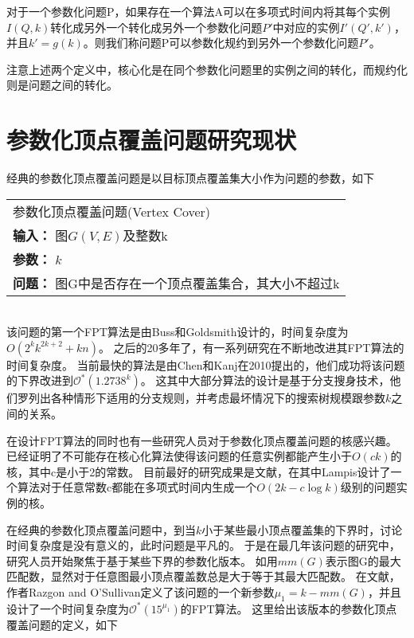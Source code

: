 \begin{definition}
对于一个参数化问题P，如果存在一个算法A可以在多项式时间内将其每个实例$I(Q, k)$转化成另外一个转化成另外一个参数化问题$P'$中对应的实例$I'(Q', k')$，
并且$k' = g(k)$。则我们称问题P可以参数化规约到另外一个参数化问题$P'$。
\end{definition}

注意上述两个定义中，核心化是在同个参数化问题里的实例之间的转化，而规约化则是问题之间的转化。

\section{参数化顶点覆盖问题研究现状}
经典的参数化顶点覆盖问题是以目标顶点覆盖集大小作为问题的参数，如下 \\

\begin{tabular}{| p{0.9\headwidth} |}
  \hline
  参数化顶点覆盖问题(Vertex Cover) \\
  \textbf{输入：} 图$G(V, E)$及整数k \\
  \textbf{参数：} $k$\\
  \textbf{问题：} 图G中是否存在一个顶点覆盖集合，其大小不超过k\\
  \hline
\end{tabular} \vspace{0.5cm} \\

该问题的第一个FPT算法是由Buss和Goldsmith设计的，时间复杂度为$O(2^kk^{2k+2} + kn)$。
之后的20多年了，有一系列研究在不断地改进其FPT算法的时间复杂度。
当前最快的算法是由Chen和Kanj在2010提出的，他们成功将该问题的下界改进到$\mathcal{O}^*(1.2738^k)$。
这其中大部分算法的设计是基于分支搜身技术，他们罗列出各种情形下适用的分支规则，并考虑最坏情况下的搜索树规模跟参数$k$之间的关系。

在设计FPT算法的同时也有一些研究人员对于参数化顶点覆盖问题的核感兴趣。
已经证明了不可能存在核心化算法使得该问题的任意实例都能产生小于$O(ck)$的核，其中c是小于2的常数。
目前最好的研究成果是文献\cite{lampis2011kernel}，在其中Lampis设计了一个算法对于任意常数c都能在多项式时间内生成一个$O(2k - c \log k)$级别的问题实例的核。

在经典的参数化顶点覆盖问题中，到当$k$小于某些最小顶点覆盖集的下界时，讨论时间复杂度是没有意义的，此时问题是平凡的。
于是在最几年该问题的研究中，研究人员开始聚焦于基于某些下界的参数化版本。
如用$mm(G)$表示图G的最大匹配数，显然对于任意图最小顶点覆盖数总是大于等于其最大匹配数。
在文献\cite{razgon2009almost}，作者Razgon and O'Sullivan定义了该问题的一个新参数$\mu_1 = k - mm(G)$，并且设计了一个时间复杂度为$\mathcal{O}^*(15^{\mu_1})$的FPT算法。
这里给出该版本的参数化顶点覆盖问题的定义，如下\\

